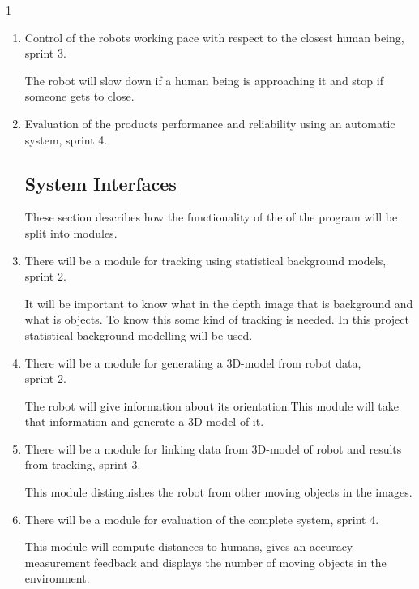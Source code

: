 1\documentclass[10pt,a4paper]{article}
\begin{document}
\begin{enumerate}
\item Control of the robots working pace with respect to the closest human being, sprint 3.

{\addtolength{\leftskip}{5mm}The robot will slow down if a human being is approaching it and stop if someone gets to close.\par}

\item Evaluation of the products performance and reliability using an automatic system, sprint 4.

\subsection{System Interfaces}
These section describes how the functionality of the of the program will be split into modules.

\item There will be a module for tracking using statistical background models, sprint 2.

{\addtolength{\leftskip}{5mm}It will be important to know what in the depth image that is background and what is objects. To know this some kind of tracking is needed. In this project statistical background modelling will be used.\par}
\item There will be a module for generating a 3D-model from robot data,\\ sprint 2.
 
{\addtolength{\leftskip}{5mm}The robot will give information about its orientation.This module will take that information and generate a 3D-model of it.\par}
 
 \item There will be a module for linking data from 3D-model of robot and results from tracking, sprint 3.

{\addtolength{\leftskip}{5mm}This module distinguishes the robot from other moving objects in the images.\par}

\item There will be a module for evaluation of the complete system, sprint 4.

{\addtolength{\leftskip}{5mm}This module will compute distances to humans, gives an accuracy measurement feedback and displays the number of moving objects in the environment. 
\par}


\end{enumerate}
\end{document}
